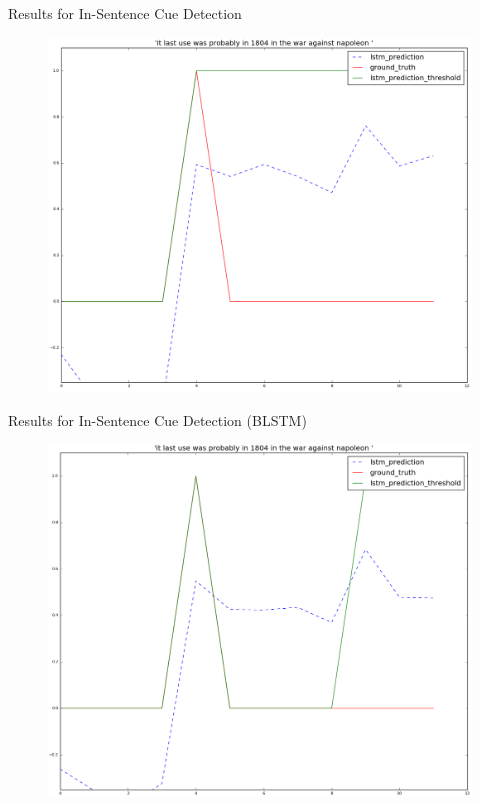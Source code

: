 \documentclass{beamer}
\begin{document}
\begin{frame}{Results for In-Sentence Cue Detection}
	\begin{figure}[htbp]
		\includegraphics[scale=0.3]{images/task2_1dir/15_type1}
	\end{figure}
\end{frame}
\begin{frame}{Results for In-Sentence Cue Detection (BLSTM)}
	\begin{figure}[htbp]
		\includegraphics[scale=0.3]{images/task2_2dir/11_type1}
	\end{figure}
\end{frame}
\end{document}
